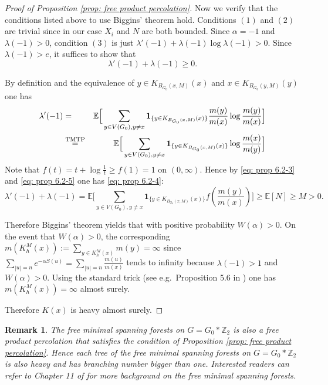 \documentclass[12pt]{article}
\newtheorem{remark}[theorem]{Remark}
\numberwithin{equation}{section}
\newcommand{\be}{\begin{equation}}
\newcommand{\ee}{\end{equation}}
\newcommand{\1}{\mathbf{1}}
\begin{document}
\begin{proof}[Proof of Proposition \ref{prop: free product percolation}]
Now we verify that the conditions listed above to use Biggins' theorem hold. 
Conditions $(1)$ and $(2)$ are trivial since in our case $X_i$ and $N$ are both bounded.
Since $\alpha=-1$ and $\lambda(-1)>0$, condition $(3)$ is just $\lambda'(-1)+\lambda(-1)\log\lambda(-1)> 0$. Since $\lambda(-1)>e$, it suffices to show that 
\be\label{eq: prop 6.2-4}
\lambda'(-1)+\lambda(-1)\geq  0.
\ee

By definition and the equivalence of $y\in K_{B_{G_0}(x,M)}(x)$ and $x\in K_{B_{G_0}(y,M)}(y)$ one has
\begin{eqnarray}\label{eq: prop 6.2-5}
\lambda'(-1)&=& \mathbb{E}\Big[\sum_{y\in V(G_0),y\neq x}  \mathbf{1}_{  \{y\in K_{B_{G_0}(x,M)}(x)\}}\frac{m(y)}{m(x)} \log \frac{m(y)}{m(x)} \Big] \nonumber\\
&\stackrel{\textnormal{TMTP}}{=}&
\mathbb{E}\Big[\sum_{y\in V(G_0),y\neq x}  \mathbf{1}_{  \{y\in K_{B_{G_0}(x,M)}(x)\}}\log \frac{m(x)}{m(y)} \Big] 
\end{eqnarray}
Note that $f(t)=t+\log\frac{1}{t}\geq f(1)=1$ on $(0,\infty)$. 
Hence by \eqref{eq: prop 6.2-3} and \eqref{eq: prop 6.2-5} one has \eqref{eq: prop 6.2-4}:
\[
\lambda'(-1)+\lambda(-1)=\mathbb{E}\Big[\sum_{y\in V(G_0),y\neq x}  \mathbf{1}_{  \{y\in K_{B_{G_0}(x,M)}(x)\}} f(\frac{m(y)}{m(x)})\Big] \geq \mathbb{E}[N]\geq M>0. 
\]


Therefore Biggins' theorem yields that with positive probability $W(\alpha)>0$. On the event that  $W(\alpha)>0$, the corresponding $m(K_h^M(x)):=\sum_{y\in K_h^M(x)}{m(y)}=\infty$ since 
$\sum_{|u|=n}{e^{-\alpha S(u)}}=\sum_{|u|=n}\frac{m(u)}{m(x)}$ tends to infinity because $\lambda(-1)>1$ and $W(\alpha)>0$. Using the standard trick (see e.g.\ Proposition 5.6 in \cite{LP2016}) one has  $m(K_h^M(x))=\infty$ almost surely. 

Therefore $K(x)$ is heavy almost surely.
\end{proof}





\begin{remark}
	The free minimal spanning forests on $G=G_0*\mathbb{Z}_2$ is also a free product percolation that satisfies the condition of Proposition \ref{prop: free product percolation}. Hence each tree of the free minimal spanning forests on $G=G_0*\mathbb{Z}_2$ is also heavy and has branching number bigger than one. Interested readers can refer to Chapter 11 of \cite{LP2016} for more background on the free minimal spanning forests.
\end{remark}
\end{document}
